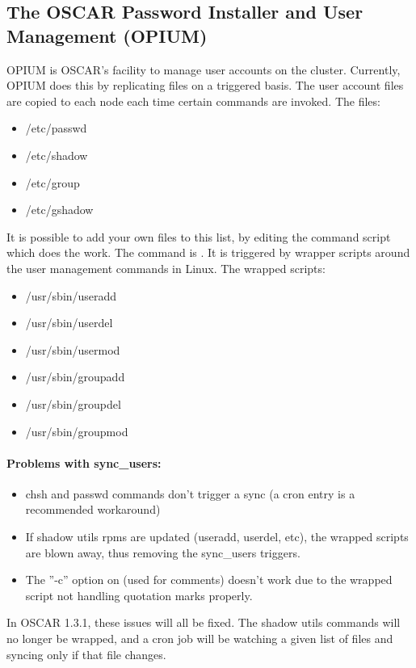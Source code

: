 %
%
%

\subsection{The OSCAR Password Installer and User Management (OPIUM)}
\label{app:opium-overview}

OPIUM is OSCAR's facility to manage user accounts on the cluster.  Currently,
OPIUM does this by replicating files on a triggered basis.  The user account
files are copied to each node each time certain commands are invoked.
The files:
\begin{itemize}
\item /etc/passwd
\item /etc/shadow
\item /etc/group
\item /etc/gshadow
\end{itemize}
It is possible to add your own files to this list, by editing the command
script which does the work.
The command is .  It is triggered by wrapper
scripts around the user management commands in Linux.  The wrapped scripts:
\begin{itemize}
\item /usr/sbin/useradd
\item /usr/sbin/userdel
\item /usr/sbin/usermod
\item /usr/sbin/groupadd
\item /usr/sbin/groupdel
\item /usr/sbin/groupmod
\end{itemize}

\paragraph{Problems with sync_users:}
\begin{itemize}
\item chsh and passwd commands don't trigger a sync (a cron entry is a
recommended workaround)
\item If shadow utils rpms are updated (useradd, userdel, etc), the wrapped 
scripts are blown away, thus removing the sync_users triggers.
\item The ''-c'' option on (used for comments) doesn't work due to
the wrapped script not handling quotation marks properly.
\end{itemize}
In OSCAR 1.3.1, these issues will all be fixed.  The shadow utils commands
will no longer be wrapped, and a cron job will be watching a given list of
files and syncing only if that file changes.

